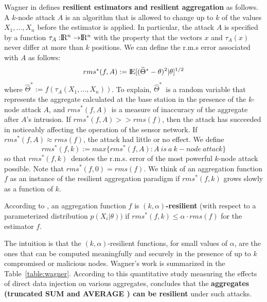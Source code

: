 	Wagner in \cite{wagner2004resilient} defines \textbf{resilient estimators and resilient aggregation } as follows.
	A $k$-node attack $A$ is an algorithm that is allowed to change up to $k$ of the values $X_{1}, \dotsc, X_{n}$ before the estimator is applied.
	In particular, the attack $A$ is specified by a function $\tau_{A} : \R^n \rightarrow  \R^n $ with the property that the vectors $x$ and $\tau_{A}(x)$ never differ at more than $k$ positions.
	We can define the r.m.s error associated with $A$ as follows:
	\begin{equation}
		rms^*(f,A) := \rm I\!E[(\widehat{\Theta}^* - \theta)^2 | \theta]^{1/2} 		  
	\end{equation}
	where $\widehat{\Theta}^* := f(\tau_{A}(X_{1},\dotsc,X_{n}))$.
	To explain, $\widehat{\Theta}^*$\ is a random variable that represents the aggregate calculated at the base station in the presence of the $k$-node attack $A$, and $rms^*(f,A)$\ is a measure of inaccuracy of the aggregate after $A$'s intrusion.
	If $rms^*(f,A) >> rms(f)$, then the attack has succeeded in noticeably affecting the operation of the sensor network.
	If $rms^*(f,A) \approx rms(f)$, the attack had little or no effect.
	We define
	\begin{equation}
		rms^*(f,k) := max\{rms^*(f,A): A\ is\ a\ k-node\ attack\}
	\end{equation}
	so that $rms^*(f,k)$\ denotes the r.m.s. error of the most powerful
	$k$-node attack possible. 
	Note that $rms^* (f, 0) = rms(f)$.
	We think of an aggregation function $f$ as an instance of the resilient aggregation paradigm if $rms^* (f, k)$ grows slowly as a function of $k$.
	\begin{definition}
		According to \cite{wagner2004resilient}, an aggregation function $f$ is \textbf{$(k, \alpha)$-resilient} (with respect to a parameterized distribution $p(X_{i} | \theta))$ if $rms^*(f, k) \le \alpha \cdot rms(f)$ for the estimator $f$.
		\label{def:resilient}
	\end{definition}
	The intuition is that the $(k, \alpha)$-resilient functions, for small values of $\alpha$, are the ones that can be computed meaningfully and securely in the presence of up to $k$ compromised or malicious nodes.
	Wagner's work is summarized in the Table~\ref{table:wagner}.
	According to this quantitative study measuring the effects of direct data injection on various aggregates, concludes that the \textbf{aggregates (truncated SUM and AVERAGE ) can be resilient} under such attacks.
